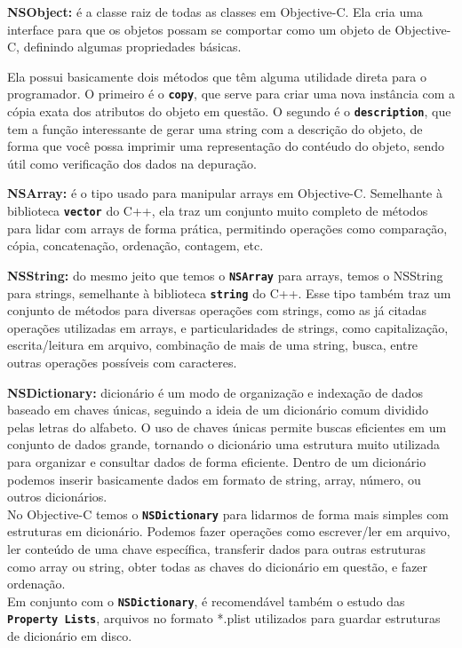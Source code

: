 \documentclass[a4paper,12pt,brazil,oneside]{book}
\begin{document}
\begin{description}
\item{\textbf{NSObject:} é a classe raiz de todas as classes em Objective-C. Ela cria uma interface para que os objetos possam se comportar como um objeto de Objective-C, definindo algumas propriedades básicas.

Ela possui basicamente dois métodos que têm alguma utilidade direta para o programador. O primeiro é o \texttt{\textbf{copy}}, que serve para criar uma nova instância com a cópia exata dos atributos do objeto em questão. O segundo é o \texttt{\textbf{description}}, que tem a função interessante de gerar uma string com a descrição do objeto, de forma que você possa imprimir uma representação do contéudo do objeto, sendo útil como verificação dos dados na depuração.}

\item{\textbf{NSArray:} é o tipo usado para manipular arrays em Objective-C. Semelhante à biblioteca \texttt{\textbf{vector}} do C++, ela traz um conjunto muito completo de métodos para lidar com arrays de forma prática, permitindo operações como comparação, cópia, concatenação, ordenação, contagem, etc.}

\item{\textbf{NSString:} do mesmo jeito que temos o \texttt{\textbf{NSArray}} para arrays, temos o NSString para strings, semelhante à biblioteca \texttt{\textbf{string}} do C++. Esse tipo também traz um conjunto de métodos para diversas operações com strings, como as já citadas operações utilizadas em arrays, e particularidades de strings, como capitalização, escrita/leitura em arquivo, combinação de mais de uma string, busca, entre outras operações possíveis com caracteres.}

\item{\textbf{NSDictionary:} dicionário é um modo de organização e indexação de dados baseado em chaves únicas, seguindo a ideia de um dicionário comum dividido pelas letras do alfabeto. O uso de chaves únicas permite buscas eficientes em um conjunto de dados grande, tornando o dicionário uma estrutura muito utilizada para organizar e consultar dados de forma eficiente. Dentro de um dicionário podemos inserir basicamente dados em formato de string, array, número, ou outros dicionários.\\
No Objective-C temos o \texttt{\textbf{NSDictionary}} para lidarmos de forma mais simples com estruturas em dicionário. Podemos fazer operações como escrever/ler em arquivo, ler conteúdo de uma chave específica, transferir dados para outras estruturas como array ou string, obter todas as chaves do dicionário em questão, e fazer ordenação.\\
Em conjunto com o \texttt{\textbf{NSDictionary}}, é recomendável também o estudo das \texttt{\textbf{Property Lists}}, arquivos no formato *.plist utilizados para guardar estruturas de dicionário em disco.}


\end{description}
\end{document}

